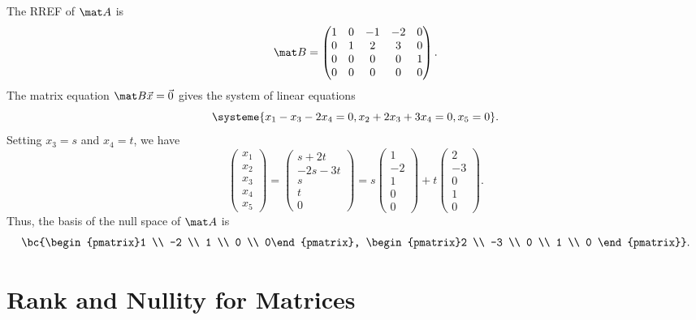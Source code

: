 \begin{sampans}
    The RREF of $\mat A$ is \[\mat B = \begin{pmatrix}1 & 0 & -1 & -2 & 0 \\ 0 & 1 & 2 & 3 & 0 \\ 0 & 0 & 0 & 0 & 1 \\ 0 & 0 & 0 & 0 & 0\end{pmatrix}.\] The matrix equation $\mat B \vec x = \vec 0$ gives the system of linear equations \[\systeme{x_1 - x_3 - 2x_4 = 0, x_2 + 2x_3 + 3x_4 = 0, x_5 = 0}.\] Setting $x_3 = s$ and $x_4 = t$, we have \[\begin{pmatrix}x_1 \\ x_2 \\ x_3 \\ x_4 \\ x_5 \end{pmatrix} = \begin{pmatrix}s + 2t \\ -2s - 3t \\ s \\ t \\ 0 \end{pmatrix} = s \begin{pmatrix}1 \\ -2 \\ 1 \\ 0 \\ 0\end{pmatrix} + t \begin{pmatrix}2 \\ -3 \\ 0 \\ 1 \\ 0 \end{pmatrix}.\] Thus, the basis of the null space of $\mat A$ is \[\bc{\begin{pmatrix}1 \\ -2 \\ 1 \\ 0 \\ 0\end{pmatrix}, \begin{pmatrix}2 \\ -3 \\ 0 \\ 1 \\ 0 \end{pmatrix}}.\]
\end{sampans}

\section{Rank and Nullity for Matrices}

